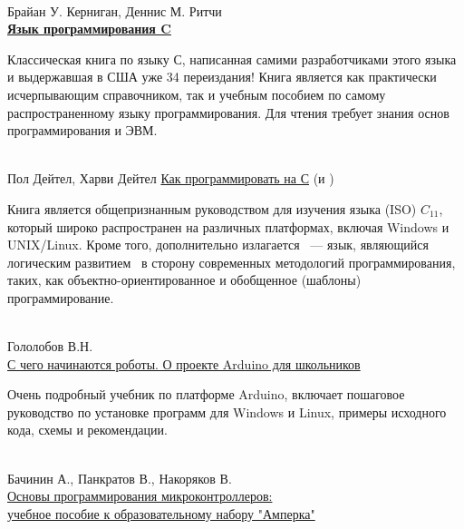 \begin{thebibliography}{99}

\clearpage

 \\
	Брайан У. Керниган, Деннис М. Ритчи\\
	\href{https://www.ozon.ru/context/detail/id/2480925/}{\textbf{Язык
	программирования C}}
	
Классическая книга по языку С, написанная самими разработчиками этого языка и
выдержавшая в США уже 34 переиздания! Книга является как практически
исчерпывающим справочником, так и учебным пособием по самому распространенному
языку программирования. Для чтения требует знания основ программирования и ЭВМ.

\clearpage

 \\
	Пол Дейтел, Харви Дейтел
	\href{https://www.ozon.ru/context/detail/id/24769512/}{Как программировать на
	С} (и \Cpp)
	
Книга является общепризнанным руководством для изучения языка (ISO) $C_{11}$,
который широко распространен на различных платформах, включая Windows и
UNIX/Linux. Кроме того, дополнительно излагается \Cpp\ --- язык, являющийся
логическим развитием \Ci\ в сторону современных методологий программирования,
таких, как объектно-ориентированное и обобщенное (шаблоны) программирование.

\clearpage

 \\
	Гололобов В.Н.\\
	\href{https://drive.google.com/open?id=1ctDWg_BTIIfJmy11MSw2ktIN0wblXter}{С
	чего начинаются роботы. О проекте Arduino для школьников}
	
Очень подробный учебник по платформе Arduino, включает пошаговое руководство по
установке программ для Windows и Linux, примеры исходного кода, схемы и
рекомендации.

\clearpage

 \\
	Бачинин А., Панкратов В., Накоряков В.\\
	\href{http://examen-technolab.ru/instuctions/tv-0441-m-1.pdf}{Основы программирования
	микроконтроллеров:\\учебное пособие к образовательному набору "Амперка"}
	

\end{thebibliography}
